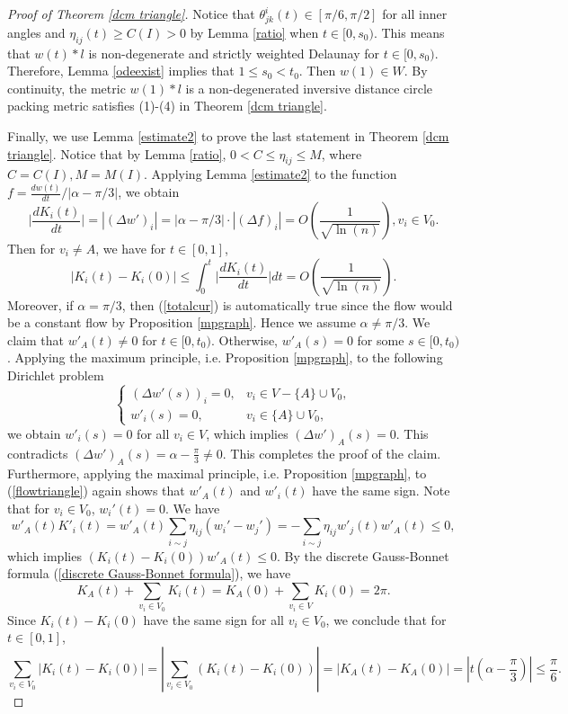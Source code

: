 \documentclass[12pt]{amsart}
\begin{document}
\begin{proof}[Proof of Theorem \ref{dcm triangle}]
   Notice that $\theta_{jk}^i(t) \in [\pi/6, \pi/2]$ for all inner angles and $\eta_{ij}(t)\geq C(I)>0$ by Lemma \ref{ratio} when $t\in [0, s_0)$. This means that $w(t)*l$ is non-degenerate and strictly weighted Delaunay for $t\in [0, s_0)$. Therefore, Lemma \ref{odeexist} implies that $1\leq s_0<t_0$. Then $w(1) \in W$. By continuity, the metric $w(1)*l$ is a non-degenerated inversive distance circle packing
   metric satisfies (1)-(4) in Theorem \ref{dcm triangle}.


	
	Finally, we use Lemma \ref{estimate2} to prove the last statement in Theorem \ref{dcm triangle}.
Notice that by Lemma \ref{ratio}, $0< C\leq \eta_{ij} \leq M$, where $C=C(I), M=M(I)$. Applying Lemma \ref{estimate2} to the function $f = \frac{{dw(t)}}{{dt}}/|\alpha  - \pi /3|$, we obtain
	\begin{equation*}\Big|\frac{{d{K_i}(t)}}{{dt}}\Big| = |{(\Delta w')_i}| = |\alpha  - \pi /3| \cdot |{(\Delta f)_i}| = O(\frac{1}{{\sqrt {\ln (n)} }}),v_i \in V_0 .
	\end{equation*}	
    Then for $v_i \ne A$, we have for $t\in[0, 1]$,
    $$|{K_i}(t) - {K_i}(0)| \le \int_0^t \Big| \frac{{d{K_i}(t)}}{{dt}}\Big|dt = O(\frac{1}{{\sqrt {\ln (n)} }}).$$
    Moreover, if $\alpha = \pi/3$, then (\ref{totalcur}) is automatically true since the flow would be a constant flow
    by Proposition \ref{mpgraph}. Hence we assume $\alpha\neq \pi/3$. We claim that $ {{w'}_A}(t) \ne 0$ for $t \in [0,{t_0})$. Otherwise, ${{w'}_A}(s) = 0$ for some $s \in [0,{t_0})$. Applying the maximum principle, i.e. Proposition \ref{mpgraph}, to the following Dirichlet problem
	$${\left\{ {\begin{array}{lr}
				{{(\Delta w'(s))}_i= 0}, &v_i \in V - \{ A\}  \cup {V_0},\\
				{w'_i}(s) = 0, &v_i \in \{ A\}  \cup {V_0},
		\end{array}} \right.}$$
	 we obtain ${w'_i}(s) = 0$ for all $v_i \in V$, which implies ${(\Delta w')_A} (s)= 0$. This contradicts ${(\Delta w')_A} (s)=\alpha  - \frac{\pi }{3} \neq 0$. This completes the proof of the claim.
Furthermore, applying the maximal principle, i.e. Proposition \ref{mpgraph}, to (\ref{flowtriangle}) again shows that $w'_A(t)$ and $w'_i(t)$ have the same sign. Note that for $v_i\in V_0$, $w_i'(t) = 0$. We have
	 $$w'_A(t)K'_i(t) =w'_A(t) \sum_{i\sim j}\eta_{ij}(w_i' - w_j') =   -\sum_{i\sim j}\eta_{ij}w'_j(t)w'_A(t) \leq 0, $$
	 which implies $({K_i}(t) - {K_i}(0)){{w'}_A}(t) \le 0$. By the discrete Gauss-Bonnet formula (\ref{discrete Gauss-Bonnet formula}), we have
    $${K_A}(t) + \sum\limits_{v_i \in {V_0}} {{K_i}} (t) = {K_A}(0) + \sum\limits_{v_i \in V} {{K_i}} (0) = 2\pi . $$
	Since ${K_i}(t) - {K_i}(0)$ have the same sign for all $v_i \in {V_0}$, we conclude that for $t\in[0,1]$,
    $$\sum\limits_{v_i \in {V_0}} | {K_i}(t) - {K_i}(0)| =|\sum\limits_{v_i \in {V_0}}  ({K_i}(t) - {K_i}(0))| = |{K_A}(t) - {K_A}(0)| = |t(\alpha  - \frac{\pi }{3})| \le \frac{\pi }{6}.$$
\end{proof}	
\end{document}

